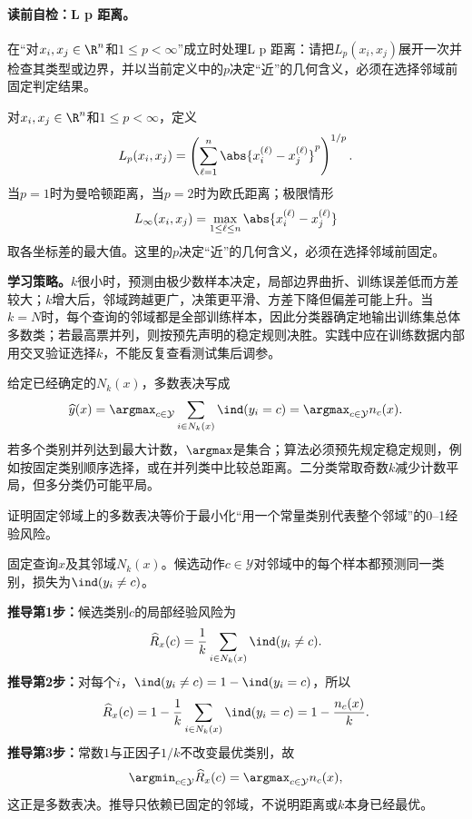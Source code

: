 \label{struct:V2-C02-CH07}
\paragraph{读前自检：L p 距离。}在“对$x_i,x_j\in\R^n$和$1\le p<\infty$”成立时处理L p 距离：请把$L_p(x_i,x_j)$展开一次并检查其类型或边界，并以当前定义中的$p$决定“近”的几何含义，必须在选择邻域前固定判定结果。\par

\begin{definition}[$L_p$距离]\label{def:V2-C02-lp}
对$x_i,x_j\in\R^n$和$1\le p<\infty$，定义
\[
L_p(x_i,x_j)=\left(\sum_{\ell=1}^{n}\abs{x_i^{(\ell)}-x_j^{(\ell)}}^p\right)^{1/p}.
\]
当$p=1$时为曼哈顿距离，当$p=2$时为欧氏距离；极限情形
\[
L_\infty(x_i,x_j)=\max_{1\le\ell\le n}\abs{x_i^{(\ell)}-x_j^{(\ell)}}
\]
取各坐标差的最大值。这里的$p$决定“近”的几何含义，必须在选择邻域前固定。
\end{definition}

\label{struct:V2-C02-CH09}
\textbf{学习策略。}$k$很小时，预测由极少数样本决定，局部边界曲折、训练误差低而方差较大；$k$增大后，邻域跨越更广，决策更平滑、方差下降但偏差可能上升。当$k=N$时，每个查询的邻域都是全部训练样本，因此分类器确定地输出训练集总体多数类；若最高票并列，则按预先声明的稳定规则决胜。实践中应在训练数据内部用交叉验证选择$k$，不能反复查看测试集后调参。

给定已经确定的$N_k(x)$，多数表决写成
\[
\widehat y(x)=\argmax_{c\in\mathcal Y}
\sum_{i\in N_k(x)}\ind(y_i=c)
=\argmax_{c\in\mathcal Y}n_c(x).
\]
若多个类别并列达到最大计数，$\argmax$是集合；算法必须预先规定稳定规则，例如按固定类别顺序选择，或在并列类中比较总距离。二分类常取奇数$k$减少计数平局，但多分类仍可能平局。

\label{struct:V2-C02-CH11}

\begin{derivationgoalbox}
证明固定邻域上的多数表决等价于最小化“用一个常量类别代表整个邻域”的0--1经验风险。
\end{derivationgoalbox}
\begin{derivationprepbox}
固定查询$x$及其邻域$N_k(x)$。候选动作$c\in\mathcal Y$对邻域中的每个样本都预测同一类别，损失为$\ind(y_i\ne c)$。
\end{derivationprepbox}
\textbf{推导第1步：}候选类别$c$的局部经验风险为
\[
\widehat R_x(c)=\frac1k\sum_{i\in N_k(x)}\ind(y_i\ne c).
\]
\textbf{推导第2步：}对每个$i$，$\ind(y_i\ne c)=1-\ind(y_i=c)$，所以
\[
\widehat R_x(c)=1-\frac1k\sum_{i\in N_k(x)}\ind(y_i=c)
=1-\frac{n_c(x)}{k}.
\]
\textbf{推导第3步：}常数$1$与正因子$1/k$不改变最优类别，故
\[
\argmin_{c\in\mathcal Y}\widehat R_x(c)
=\argmax_{c\in\mathcal Y}n_c(x),
\]
这正是多数表决。推导只依赖已固定的邻域，不说明距离或$k$本身已经最优。

